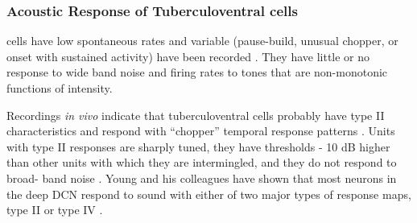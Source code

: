 


\subsubsection{Acoustic Response of Tuberculoventral cells}
                        
\TV cells have low spontaneous rates and variable \PSTHs (pause-build, unusual
chopper, or onset with sustained activity) have been recorded
\citep{ShofnerYoung:1985,SpirouDavisEtAl:1999}.  They have little or no response
to wide band noise and firing rates to \CF tones that are non-monotonic
functions of intensity.

Recordings \textit{in vivo} indicate that tuberculoventral cells probably have
type II characteristics and respond with “chopper” temporal response patterns
\citep{ZhangOertel:1993b}.  Units with type II responses are sharply tuned, they
have thresholds - 10 dB higher than other units with which they are
intermingled, and they do not respond to broad- band noise
\citep{SpirouDavisEtAl:1999,YoungBrownell:1976,Young:1980,SachsYoung:1980,YoungVoigt:1982,ShofnerYoung:1985,VoigtYoung:1990,YoungSpirouEtAl:1992,Rhode:1999}. Young
and his colleagues have shown that most neurons in the deep DCN respond to sound
with either of two major types of response maps, type II or type IV
\citep{EvansNelson:1973,ShofnerYoung:1985,VoigtYoung:1980,VoigtYoung:1990,Young:1980,YoungBrownell:1976}.

